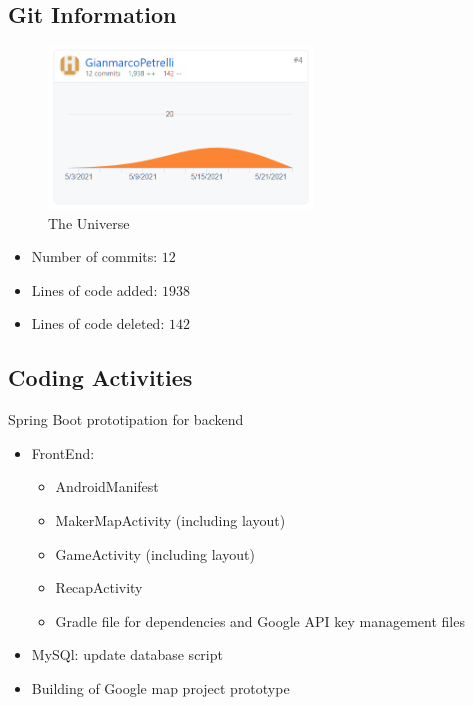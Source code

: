 \documentclass{article}
\begin{document}
\subsection{Git Information}

\begin{figure}[h!]
\centering
\includegraphics[width=7cm]{img/gp.PNG}
\caption{The Universe}
\label{fig:universe}
\end{figure}

\begin{itemize}
    \item Number of commits: \(12\)
    \item Lines of code added: \(1938\)
    \item Lines of code deleted: \(142\)
\end{itemize}

\subsection{Coding Activities}

Spring Boot prototipation for backend
	

\begin{itemize}
    \item FrontEnd:
    \begin{itemize}
        \item AndroidManifest
        \item MakerMapActivity (including layout)
        \item GameActivity (including layout)
        \item RecapActivity
        \item Gradle file for dependencies and Google API key management files
    \end{itemize}
    \item MySQl: update database script
	\item Building of Google map project prototype
\end{itemize}
\end{document}
